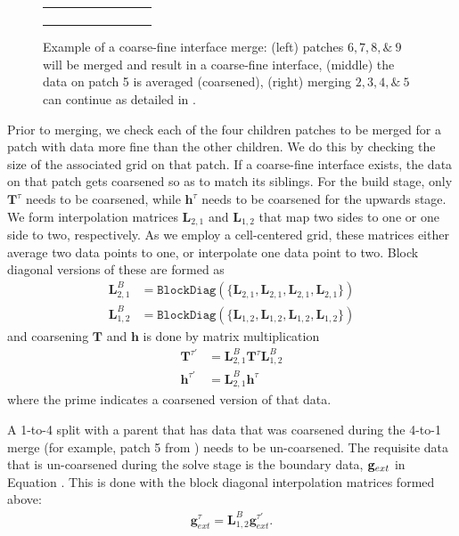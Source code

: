 \begin{figure}
\begin{tabular}{ccc}
\begin{subfigure}[t]{0.3\textwidth}
        \end{subfigure}
    \end{tabular}
    \caption{Example of a coarse-fine interface merge: (left) patches $6, 7, 8, \&\ 9$ will be merged and result in a coarse-fine interface, (middle) the data on patch 5 is averaged (coarsened), (right) merging $2, 3, 4, \&\ 5$ can continue as detailed in .}
    \label{fig:adaptive_merge}
\end{figure}

Prior to merging, we check each of the four children patches to be merged for a patch with data more fine than the other children. We do this by checking the size of the associated grid on that patch. If a coarse-fine interface exists, the data on that patch gets coarsened so as to match its siblings. For the build stage, only $\mathbf{T}^{\tau}$ needs to be coarsened, while $\textbf{h}^{\tau}$ needs to be coarsened for the upwards stage. We form interpolation matrices $\textbf{L}_{2,1}$ and $\textbf{L}_{1,2}$ that map two sides to one or one side to two, respectively. As we employ a cell-centered grid, these matrices either average two data points to one, or interpolate one data point to two. Block diagonal versions of these are formed as
\begin{align}
    \textbf{L}_{2,1}^{B} &= \texttt{BlockDiag}(\{\textbf{L}_{2,1}, \textbf{L}_{2,1}, \textbf{L}_{2,1}, \textbf{L}_{2,1}\}) \\
    \textbf{L}_{1,2}^{B} &= \texttt{BlockDiag}(\{\textbf{L}_{1,2}, \textbf{L}_{1,2}, \textbf{L}_{1,2}, \textbf{L}_{1,2}\})
\end{align}
and coarsening $\textbf{T}$ and $\textbf{h}$ is done by matrix multiplication
\begin{align}
    \textbf{T}^{\tau'} &= \textbf{L}_{2,1}^{B} \textbf{T}^{\tau} \textbf{L}_{1,2}^{B} \\
    \textbf{h}^{\tau'} &= \textbf{L}_{2,1}^{B} \textbf{h}^{\tau}
\end{align}
where the prime indicates a coarsened version of that data.

A 1-to-4 split with a parent that has data that was coarsened during the 4-to-1 merge (for example, patch 5 from ) needs to be un-coarsened. The requisite data that is un-coarsened during the solve stage is the boundary data, $\mathbf g_{ext}$ in Equation . This is done with the block diagonal interpolation matrices formed above:
\begin{align}
    \textbf{g}^{\tau}_{ext} = \textbf{L}_{1,2}^{B} \textbf{g}^{\tau'}_{ext}.
\end{align}

